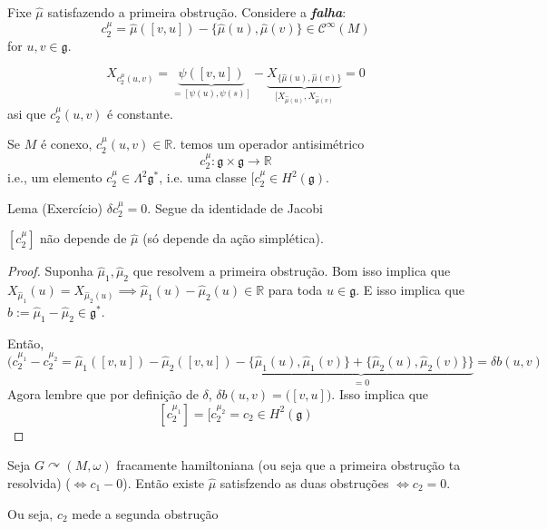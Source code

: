 Fixe $\hat{\mu}$ satisfazendo a primeira obstrução. Considere a \textit{\textbf{falha}}:
\[c^\mu_2=\hat{\mu}([v,u])-\{\hat{\mu}(u),\hat{\mu}(v)\} \in\mathcal{C}^\infty(M)\]
for $u,v\in\mathfrak{g}$.

\begin{remark}\leavevmode
	\[X_{c^\mu_2(u,v)}=\underbrace{\psi([v,u])}_{=[\psi(u),\psi(s)]}-\underbrace{X_{\{\hat{\mu}(u),\hat{\mu}(v)\}}}_{[X_{\hat{\mu}(u)},X_{\hat{\mu}(v)}}=0\]
	asi que $c_2^\mu(u,v)$ é constante.

	Se $M$  é conexo, $c_2^\mu(u,v)\in\mathbb{R}$. temos um operador antisimétrico
	\[c_2^\mu:\mathfrak{g} \times \mathfrak{g} \to \mathbb{R}\]
	i.e., um elemento $c_2^\mu\in \Lambda^2\mathfrak{g}^*$, i.e. uma classe $[c_2^\mu\in H^{2}(\mathfrak{g})$.
\end{remark}

\begin{thing4}{Lema (Exercício)}\leavevmode
	$\delta c^\mu_2=0$. Segue da identidade de Jacobi
\end{thing4}

\begin{lemma}\leavevmode
	$[c_2^\mu]$ não depende de $\hat{\mu}$ (só depende da ação simplética).
\end{lemma}

\begin{proof}\leavevmode
	Suponha $\hat{\mu}_1,\hat{\mu}_2$ que resolvem a primeira obstrução. Bom isso implica que $X_{\hat{\mu}_1}(u)=X_{\hat{\mu}_2(u)}\implies \hat{\mu}_1(u)-\hat{\mu}_2(u)\in\mathbb{R}$ para toda $u\in\mathfrak{g}$. E isso implica que $b:=\hat{\mu}_1-\hat{\mu}_2\in\mathfrak{g}^*$.

Então,
\[(c_2^{\mu_1}-c_2^{\mu_2}=\hat{\mu}_1([v,u])-\hat{\mu}_2([v,u])- \underbrace{\{\hat{\mu}_1(u),\hat{\mu}_1(v)\} +\{\hat{\mu}_2(u),\hat{\mu}_2(v)\}\}}_{=0}=\delta b(u,v)\]
Agora lembre que por definição  de $\delta$, $\delta b (u,v)=\big([v,u])$. Isso implica que
	\[ [c_2^{\mu_1}]=[c_2^{\mu_2}=c_2\in H^{2}(\mathfrak{g})\]
\end{proof}

\begin{prop}\leavevmode
	Seja $G\curvearrowright(M,\omega)$ fracamente hamiltoniana (ou seja que a primeira obstrução ta resolvida) ($\iff c_1-0$). Então existe  $\hat{\mu}$ satisfzendo as duas obstruções  $\iff c_2=0$.
\end{prop}

\begin{thing8}{Ou seja, $c_2$ mede a segunda obstrução}\leavevmode
\end{thing8}


